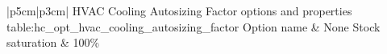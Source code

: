 \begin{customLongTable}{ |p{5cm}|p{3cm}| }
{HVAC Cooling Autosizing Factor options and properties} {table:hc_opt_hvac_cooling_autosizing_factor}
{Option name & None}
\endhead
\hline
Stock saturation & 100\% \\ \hline
\end{customLongTable}
